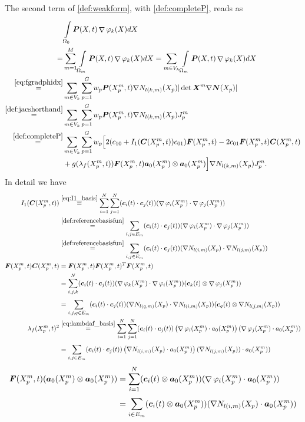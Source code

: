 \documentclass[a4paper,12pt]{article}
\newcommand{\Or}{\Omega_0}
\newcommand{\intor}{\intl{\Or}{}}
\DeclareMathOperator{\divergence}{\nabla}
\newcommand{\sumgp}{\suml{p=1}{G}}
\newcommand{\jmp}{J^m_p}
\newcommand{\re}[1]{\stackrel{\eqref{#1}}{=}}
\newcommand{\sumvk}{\suml{m\in V_k}{}}
\newcommand{\pmp}{X^m_p}%
\begin{document}
The second term of \eqref{def:weakform}, with \eqref{def:completeP}, reads as
\begin{align*}
		&\intor\vP(X,t)\divergence\varphi_k(X) dX\\
		=& \suml{m=1}{M}\intl{\Omega_m}{}\vP(X,t)\divergence\varphi_k(X) dX
			= \sumvk\intl{\Omega_m}{}\vP(X,t)\divergence\varphi_k(X) dX\\
		\re{eq:fgradphidx}&\sumvk\sumgp w_p\vP(\pmp,t)\nabla N_{l(k,m)}(X_p)|\det \vX^m\nabla\vN(X_p)|\\
		\re{def:jacshorthand}&\sumvk\sumgp w_p\vP(\pmp,t)\nabla N_{l(k,m)}(X_p)\jmp\\
		\re{def:completeP}&\sumvk\sumgp w_p\Bigl[2(c_{10} + I_1(\vC(\pmp,t))c_{01})\vF(\pmp,t) - 2c_{01}\vF(\pmp,t)\vC(\pmp,t)\\
			 &+g(\lambda_f(\pmp,t))\vF(\pmp,t)\va_0(\pmp)\otimes\va_0(\pmp)\Bigr]\nabla N_{l(k,m)}(X_p)\jmp\nonumber.
\end{align*}
In detail we have
\begin{align*}
	I_1(\vC(\pmp,t)) &\re{eq:I1_basis} \sumi\sumj (\vc_i(t) \cdot \vc_j(t))(\divergence\varphi_i(\pmp) \cdot \divergence\varphi_j(\pmp))\\
	&\re{def:referencebasisfun} \suml{i,j\in E_m}{} (\vc_i(t) \cdot \vc_j(t))(\divergence\varphi_i(\pmp) \cdot \divergence\varphi_j(\pmp))\\
	&\re{def:referencebasisfun} \suml{i,j\in E_m}{} (\vc_i(t) \cdot \vc_j(t))(\nabla N_{l(i,m)}(X_p) \cdot \nabla N_{l(j,m)}(X_p))\\
	\vF(\pmp,t)\vC(\pmp,t) &= \vF(\pmp,t)\vF(\pmp,t)^T\vF(\pmp,t)\\
    	&= \suml{i,j,k}{N}(\vc_i(t)\cdot \vc_j(t))(\divergence\varphi_k(\pmp)\cdot\divergence\varphi_i(\pmp))(\vc_k(t)\otimes\divergence\varphi_j(\pmp))\\
    	&= \suml{i,j,q\in E_m}{}(\vc_i(t)\cdot \vc_j(t))(\nabla N_{l(q,m)}(X_p)\cdot\nabla N_{l(i,m)}(X_p))(\vc_q(t)\otimes\nabla N_{l(j,m)}(X_p))\\
    \lambda_f(\pmp,t)^2 &\re{eq:lambdaf_basis}
    		\sumi\sumj (\vc_i(t)\cdot \vc_j(t))\left(\divergence\varphi_i(\pmp)\cdot a_0(\pmp)\right)(\divergence\varphi_j(\pmp)\cdot a_0(\pmp))\nonumber\\
    	&= \suml{i,j\in E_m}{} (\vc_i(t)\cdot \vc_j(t))\left(\nabla N_{l(i,m)}(X_p)\cdot a_0(\pmp)\right)(\nabla N_{l(j,m)}(X_p))\cdot a_0(\pmp))\nonumber
\end{align*} 
\begin{align*}  	
    \vF(\pmp,t)(\va_0(\pmp)\otimes\va_0(\pmp)) 
    	&= \sumi (\vc_i(t)\otimes \va_0(\pmp))(\divergence\varphi_i(\pmp)\cdot\va_0(\pmp))\nonumber\\
    	&= \suml{i\in E_m}{} (\vc_i(t)\otimes \va_0(\pmp))(\nabla N_{l(i,m)}(X_p)\cdot\va_0(\pmp))\nonumber
\end{align*}
\end{document}
